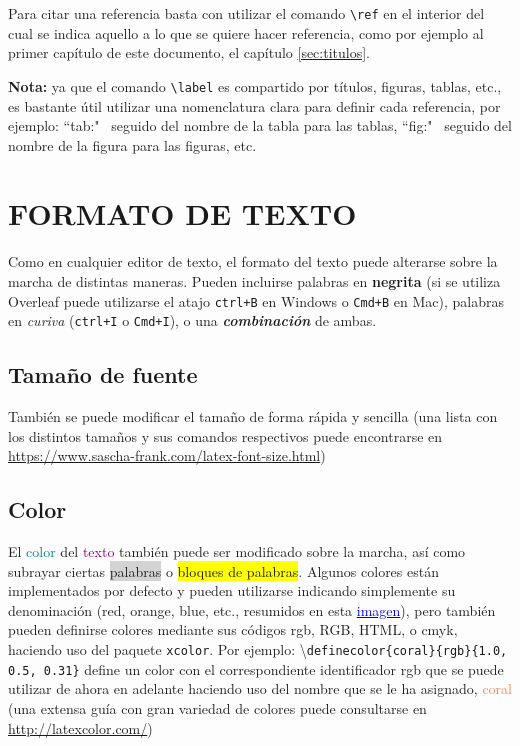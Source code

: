 \documentclass[a4paper, 11pt, spanish, twoside]{article}
\begin{document}
Para citar una referencia basta con utilizar el comando \texttt{\textbackslash ref} en el interior del cual se indica aquello a lo que se quiere hacer referencia, como por ejemplo al primer capítulo de este documento, el capítulo \ref{sec:titulos}.

\textbf{Nota:} ya que el comando \texttt{\textbackslash label} es compartido por títulos, figuras, tablas, etc., es bastante útil utilizar una nomenclatura clara para definir cada referencia, por ejemplo: ``tab:" \ seguido del nombre de la tabla para las tablas, ``fig:" \ seguido del nombre de la figura para las figuras, etc.




\newpage
\section{FORMATO DE TEXTO} \label{sec:formato}

Como en cualquier editor de texto, el formato del texto puede alterarse sobre la marcha de distintas maneras. Pueden incluirse palabras en \textbf{negrita} (si se utiliza Overleaf puede utilizarse el atajo \texttt{ctrl+B} en Windows o \texttt{Cmd+B} en Mac), palabras en \textit{curiva} (\texttt{ctrl+I} o \texttt{Cmd+I}), o una \textit{\textbf{combinación}} de ambas.


\subsection{Tamaño de fuente}

También se puede modificar el {\huge tamaño} de forma {\footnotesize rápida} y {\Large sencilla} (una lista con los distintos tamaños y sus comandos respectivos puede encontrarse en \url{https://www.sascha-frank.com/latex-font-size.html})


\subsection{Color}


El \textcolor{teal}{color} del \textcolor{purple}{texto} también puede ser modificado sobre la marcha, así como subrayar ciertas \colorbox{lightgray}{palabras} o \colorbox{yellow}{bloques de palabras}. Algunos colores están implementados por defecto y pueden utilizarse indicando simplemente su denominación (red, orange, blue, etc., resumidos en esta \href{https://i.stack.imgur.com/tmoHS.png}{\textcolor{blue}{imagen}}), pero también pueden definirse colores mediante sus códigos rgb, RGB, HTML, o cmyk, haciendo uso del paquete \texttt{xcolor}. Por ejemplo: \textbackslash \texttt{definecolor\{coral\}\{rgb\}\{1.0, 0.5, 0.31\}} define un color con el correspondiente identificador rgb que se puede utilizar de ahora en adelante haciendo uso del nombre que se le ha asignado, \textcolor{coral}{coral} (una extensa guía con gran variedad de colores puede consultarse en \url{http://latexcolor.com/})
\end{document}
